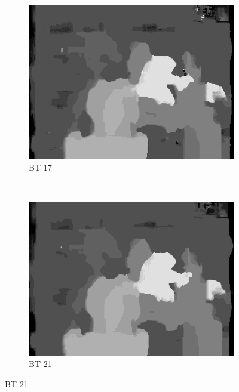 \begin{figure}
\begin{subfigure}[b]{0.23\textwidth}
    \includegraphics[width=\textwidth]{images/stereo-pairs/tsukuba_bt_17.png}
    \caption{BT 17}
  \end{subfigure}
  ~
  \begin{subfigure}[b]{0.23\textwidth}
    \centering
    \includegraphics[width=\textwidth]{images/stereo-pairs/tsukuba_bt_21.png}
    \caption{BT 21}
  \end{subfigure}


\end{figure}
